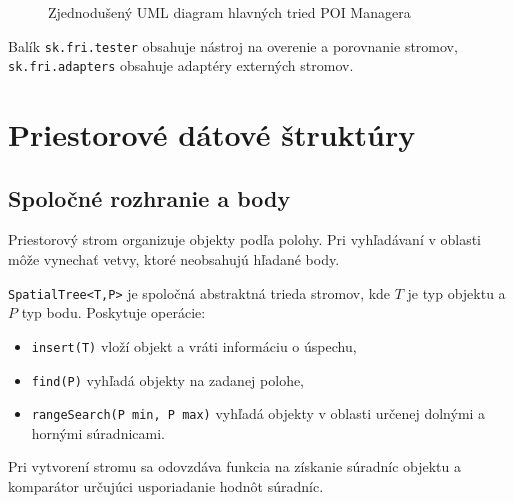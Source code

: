 \documentclass[12pt,a4paper,oneside]{report}
\begin{document}
\begin{figure}[H]
\centering
{}
\caption{Zjednodušený UML diagram hlavných tried POI Managera}
\label{fig:class-diagram}
\end{figure}

Balík \texttt{sk.fri.tester} obsahuje nástroj na overenie a porovnanie
stromov, \texttt{sk.fri.adapters} obsahuje adaptéry externých stromov.

\chapter{Priestorové dátové štruktúry}
\label{chap:structures}

\section{Spoločné rozhranie a body}
Priestorový strom organizuje objekty podľa polohy. Pri vyhľadávaní
v oblasti môže vynechať vetvy, ktoré neobsahujú hľadané body.

\texttt{SpatialTree<T,P>} je spoločná abstraktná trieda stromov,
kde \(T\) je typ objektu a \(P\) typ bodu. Poskytuje operácie:
\begin{itemize}[leftmargin=1.5em]
\item \texttt{insert(T)} vloží objekt a vráti informáciu o úspechu,
\item \texttt{find(P)} vyhľadá objekty na zadanej polohe,
\item \texttt{rangeSearch(P min, P max)} vyhľadá objekty v oblasti
  určenej dolnými a hornými súradnicami.
\end{itemize}
Pri vytvorení stromu sa odovzdáva funkcia na získanie súradníc objektu
a komparátor určujúci usporiadanie hodnôt súradníc.
\end{document}
